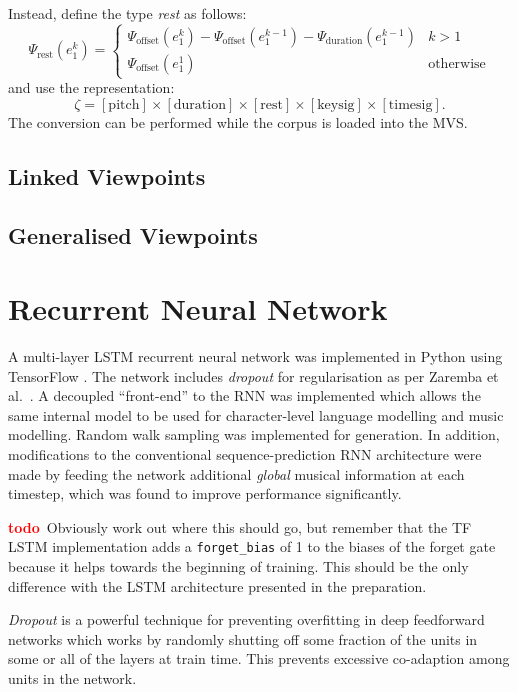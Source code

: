 \documentclass[12pt,a4paper,twoside,openright]{report}
\newcommand{\todo}{\textcolor{red}{\textbf{todo}~}}
\begin{document}
Instead, define the type \emph{rest} as follows:
$$ \Psi_{\mathrm{rest}}(e_1^k) = \begin{cases} 
  \Psi_{\mathrm{offset}}(e_1^k) -
  \Psi_{\mathrm{offset}}(e_1^{k-1}) - \Psi_{\mathrm{duration}}(e_1^{k-1}) & k > 1 \\
  \Psi_{\mathrm{offset}}(e_1^1) & \text{otherwise}
\end{cases} $$
and use the representation:
$$ \zeta = [\mathrm{pitch}] \times [\mathrm{duration}] \times [\mathrm{rest}]
\times [\mathrm{keysig}] \times [\mathrm{timesig}]. $$
The conversion can be performed while the corpus is loaded into the MVS.

\subsection{Linked Viewpoints}

\subsection{Generalised Viewpoints}

\section{Recurrent Neural Network}

A multi-layer LSTM recurrent neural network was implemented in Python using
TensorFlow \cite{abadi2016tensorflow}. The network includes \emph{dropout} for
regularisation as per Zaremba et al.\ \cite{zaremba2014recurrent}. A decoupled
``front-end'' to the RNN was implemented which allows the same internal model to
be used for character-level language modelling and music modelling. Random walk
sampling was implemented for generation. In addition, modifications to the
conventional sequence-prediction RNN architecture were made by feeding the
network additional \emph{global} musical information at each timestep, which was
found to improve performance significantly.

\todo Obviously work out where this should go, but remember that the TF LSTM
implementation adds a \texttt{forget\_bias} of 1 to the biases of the forget
gate because it helps towards the beginning of training. This should be the only
difference with the LSTM architecture presented in the preparation.

\emph{Dropout} \cite{srivastava2014dropout} is a powerful technique for
preventing overfitting in deep feedforward networks which works by randomly
shutting off some fraction of the units in some or all of the layers at train
time. This prevents excessive co-adaption among units in the network.
\end{document}
